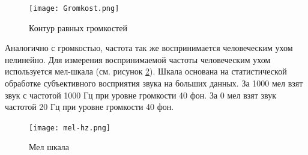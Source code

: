 \begin{figure}[t]
\centering
	\texttt{[image: Gromkost.png]}
	\caption{Контур равных громкостей}
	\label{sec:analysus:sound_contur}
\end{figure}

Аналогично с громкостью, частота так же воспринимается человеческим ухом нелинейно. Для измерения воспринимаемой частоты человеческим ухом используется мел-шкала (см. рисунок \ref{sec:analysus:mel}). Шкала основана на статистической обработке субъективного восприятия звука на больших данных. За 1000 мел взят звук с частотой 1000 Гц при уровне громкости 40 фон. За 0 мел взят звук частотой 20 Гц при уровне громкости 40 фон.

\begin{figure}[t]
\centering
	\texttt{[image: mel-hz.png]}
	\caption{Мел шкала}
	\label{sec:analysus:mel}
\end{figure}
